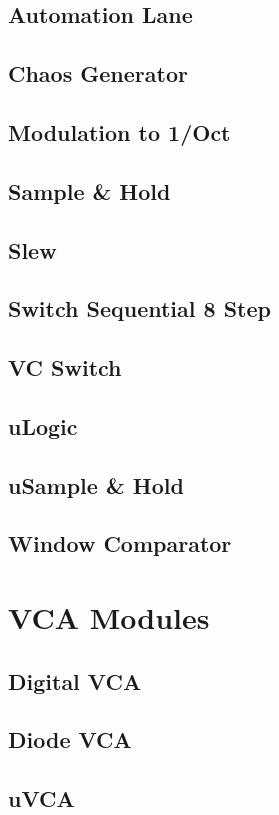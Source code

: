\documentclass[11pt]{book}
\begin{document}
\section{Automation Lane}
\section{Chaos Generator}
\section{Modulation to 1/Oct}
\section{Sample \& Hold}
\section{Slew}
\section{Switch Sequential 8 Step}
\section{VC Switch}
\section{uLogic}
\section{uSample \& Hold}
\section{Window Comparator}

\chapter{VCA Modules}
\section{Digital VCA}
\section{Diode VCA}
\section{uVCA}
\end{document}
